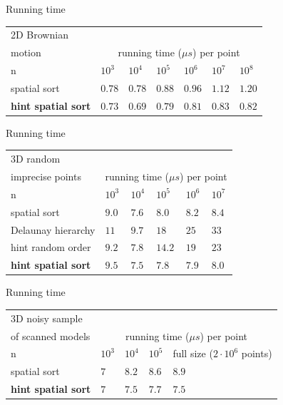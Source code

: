 \documentclass{beamer}
\begin{document}
\begin{frame}{Running time}
\begin{tabular}{|l||l|l|l|l|l|l|}
\hline
2D Brownian \\
motion & \multicolumn{6}{|c|}{running time  ($\mu s$) per point}\\
 \hline \hline
    n & $10^3$ & $10^4$ & $10^5$ & $10^6$ & $10^7$ & $10^8$ \\\hline
    spatial sort & $0.78$ & $0.78 $ & $0.88 $ & $0.96 $ & $1.12 $ & $1.20$\\\hline
    \textbf{hint spatial sort} & $0.73 $ & $0.69$ & $0.79$ & $0.81 $ & $0.83 $ & $0.82$\\
    \hline
\end{tabular}
\end{frame}

\begin{frame}{Running time}
\begin{tabular}{|l||l|l|l|l|l|}
\hline
3D random \\
imprecise points & \multicolumn{5}{|c|}{running time  ($\mu s$) per point}\\
 \hline \hline
    n & $10^3$ & $10^4$ & $10^5$ & $10^6$ & $10^7$ \\\hline
    spatial sort & $9.0$ & $7.6 $ & $8.0$ & $8.2$ & $8.4$\\\hline
    Delaunay hierarchy & $11$ & $9.7$ & $18$ & $25$ & $33$\\\hline
    hint random order & $9.2 $ & $7.8 $ & $14.2 $ & $19 $ & $23$ \\\hline
    \textbf{hint spatial sort} & $9.5$ & $7.5$ & $7.8$ & $7.9$ & $8.0$\\\hline
\end{tabular}
\end{frame}

\begin{frame}{Running time}
\begin{tabular}{|l||l|l|l|l|}
\hline
3D noisy sample \\
of scanned models& \multicolumn{4}{|c|}{running time  ($\mu s$) per point}\\
 \hline \hline
    n & $10^3$ & $10^4$ & $10^5$ & full size ($2 \cdot 10^6$ points)\\\hline
    spatial sort & $7$ & $8.2$ & $8.6$ & $8.9$\\\hline
    \textbf{hint spatial sort} & $7$ & $7.5$ & $7.7$ & $7.5$\\\hline
\end{tabular}
\end{frame}
\end{document}
